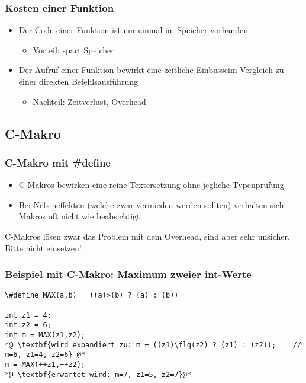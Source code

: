 \subsubsection{Kosten einer Funktion\hfill}
\label{sec:unterunterabschnitt}
\begin{itemize}
	\item Der Code einer Funktion ist nur einmal im Speicher vorhanden
	\begin{itemize}
		\item Vorteil: spart Speicher
	\end{itemize}
	\item Der Aufruf einer Funktion bewirkt eine zeitliche Einbusseim Vergleich zu einer direkten Befehlsausführung
	\begin{itemize}
		\item Nachteil: Zeitverlust, Overhead
	\end{itemize}
\end{itemize}


\subsection{C-Makro\hfill}
\label{sec:unterabschnitt}

\subsubsection{C-Makro mit \#define\hfill}
\label{sec:unterunterabschnitt}
\begin{itemize}
	\item C-Makros bewirken eine reine Textersetzung ohne jegliche Typenprüfung
	\item Bei Nebeneffekten (welche zwar vermieden werden sollten) verhalten sich Makros oft nicht wie beabsichtigt
\end{itemize}
\begin{achtung}	%
C-Makros lösen zwar das Problem mit dem Overhead, sind aber sehr unsicher. Bitte nicht einsetzen!
\end{achtung}


\subsubsection{Beispiel mit C-Makro: Maximum zweier int-Werte\hfill}
\label{sec:unterrunterabschnitt}
\noindent
\begin{minipage}{\linewidth}
\begin{lstlisting}
\#define MAX(a,b)	((a)>(b) ? (a) : (b))

int z1 = 4;
int z2 = 6;
int m = MAX(z1,z2);
*@ \textbf{wird expandiert zu: m = ((z1)\flq(z2) ? (z1) : (z2));	// m=6, z1=4, z2=6} @*
m = MAX(++z1,++z2);
*@ \textbf{erwartet wird: m=7, z1=5, z2=7}@*
\end{lstlisting}
\end{minipage}

